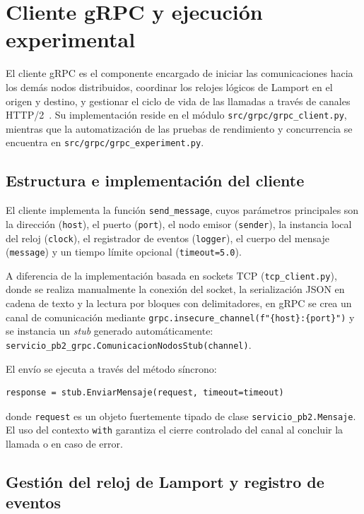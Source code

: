 \section{Cliente gRPC y ejecución experimental}

El cliente gRPC es el componente encargado de iniciar las comunicaciones hacia
los demás nodos distribuidos, coordinar los relojes lógicos de Lamport en el
origen y destino, y gestionar el ciclo de vida de las llamadas a través de
canales HTTP/2~\cite{rfc9113}. Su implementación reside en el módulo
\texttt{src/grpc/grpc\_client.py}, mientras que la automatización de las
pruebas de rendimiento y concurrencia se encuentra en
\texttt{src/grpc/grpc\_experiment.py}.

\subsection{Estructura e implementación del cliente}

El cliente implementa la función \texttt{send\_message}, cuyos parámetros
principales son la dirección (\texttt{host}), el puerto (\texttt{port}), el
nodo emisor (\texttt{sender}), la instancia local del reloj
(\texttt{clock}), el registrador de eventos (\texttt{logger}), el cuerpo del
mensaje (\texttt{message}) y un tiempo límite opcional (\texttt{timeout=5.0}).

A diferencia de la implementación basada en sockets TCP (\texttt{tcp\_client.py}),
donde se realiza manualmente la conexión del socket, la serialización JSON en
cadena de texto y la lectura por bloques con delimitadores, en gRPC se crea un
canal de comunicación mediante \texttt{grpc.insecure\_channel(f"\{host\}:\{port\}")}
y se instancia un \emph{stub} generado automáticamente:
\texttt{servicio\_pb2\_grpc.ComunicacionNodosStub(channel)}.

El envío se ejecuta a través del método síncrono:
\begin{verbatim}
response = stub.EnviarMensaje(request, timeout=timeout)
\end{verbatim}
donde \texttt{request} es un objeto fuertemente tipado de clase
\texttt{servicio\_pb2.Mensaje}. El uso del contexto \texttt{with} garantiza
el cierre controlado del canal al concluir la llamada o en caso de error.

\subsection{Gestión del reloj de Lamport y registro de eventos}

